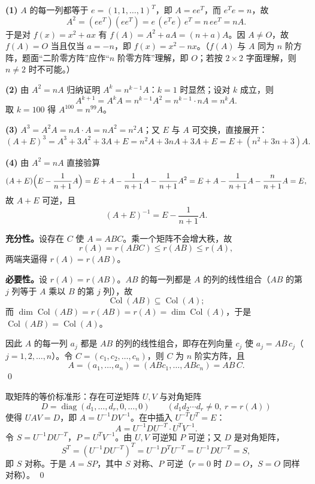 \begin{solution}
\textbf{(1)} $A$ 的每一列都等于 $e=(1,1,\dots,1)^{T}$，即 $A=ee^{T}$，而 $e^{T}e=n$，故
\[
A^{2}=(ee^{T})(ee^{T})=e\,(e^{T}e)\,e^{T}=n\,ee^{T}=nA .
\]
于是对 $f(x)=x^{2}+ax$ 有 $f(A)=A^{2}+aA=(n+a)A$。因 $A\ne O$，故 $f(A)=O$ 当且仅当 $a=-n$，即 $f(x)=x^{2}-nx$。（$f(A)$ 与 $A$ 同为 $n$ 阶方阵，题面“二阶零方阵”应作“$n$ 阶零方阵”理解，即 $O$；若按 $2\times2$ 字面理解，则 $n\ne2$ 时不可能。）

\textbf{(2)} 由 $A^{2}=nA$ 归纳证明 $A^{k}=n^{k-1}A$：$k=1$ 时显然；设对 $k$ 成立，则
\[
A^{k+1}=A^{k}A=n^{k-1}A^{2}=n^{k-1}\cdot nA=n^{k}A .
\]
取 $k=100$ 得 $A^{100}=n^{99}A$。

\textbf{(3)} $A^{3}=A^{2}A=nA\cdot A=nA^{2}=n^{2}A$；又 $E$ 与 $A$ 可交换，直接展开：
\[
(A+E)^{3}=A^{3}+3A^{2}+3A+E=n^{2}A+3nA+3A+E=E+(n^{2}+3n+3)A .
\]

\textbf{(4)} 由 $A^{2}=nA$ 直接验算
\[
(A+E)\Bigl(E-\frac{1}{n+1}A\Bigr)
=E+A-\frac{1}{n+1}A-\frac{1}{n+1}A^{2}
=E+A-\frac{1}{n+1}A-\frac{n}{n+1}A=E,
\]
故 $A+E$ 可逆，且
\[
(A+E)^{-1}=E-\frac{1}{n+1}A .
\]
\end{solution}

\begin{solution}
\textbf{充分性。}设存在 $C$ 使 $A=ABC$。乘一个矩阵不会增大秩，故
\[
r(A)=r(ABC)\le r(AB)\le r(A),
\]
两端夹逼得 $r(A)=r(AB)$。

\textbf{必要性。}设 $r(A)=r(AB)$。$AB$ 的每一列都是 $A$ 的列的线性组合（$AB$ 的第 $j$ 列等于 $A$ 乘以 $B$ 的第 $j$ 列），故
\[
\operatorname{Col}(AB)\subseteq\operatorname{Col}(A);
\]
而 $\dim\operatorname{Col}(AB)=r(AB)=r(A)=\dim\operatorname{Col}(A)$，于是 $\operatorname{Col}(AB)=\operatorname{Col}(A)$。

因此 $A$ 的每一列 $a_j$ 都是 $AB$ 的列的线性组合，即存在列向量 $c_j$ 使 $a_j=AB\,c_j$（$j=1,2,\dots,n$）。令 $C=(c_1,c_2,\dots,c_n)$，则 $C$ 为 $n$ 阶实方阵，且
\[
A=(a_1,\dots,a_n)=(ABc_1,\dots,ABc_n)=AB\,C .
\]
\qed
\end{solution}

\begin{solution}
取矩阵的等价标准形：存在可逆矩阵 $U,V$ 与对角矩阵
\[
D=\operatorname{diag}(d_1,\dots,d_r,0,\dots,0)\qquad(d_1d_2\cdots d_r\ne0,\ r=r(A))
\]
使得 $UAV=D$，即 $A=U^{-1}DV^{-1}$。在中插入 $U^{-T}U^{T}=E$：
\[
A=U^{-1}DU^{-T}\cdot U^{T}V^{-1}.
\]
令 $S=U^{-1}DU^{-T}$，$P=U^{T}V^{-1}$。由 $U,V$ 可逆知 $P$ 可逆；又 $D$ 是对角矩阵，
\[
S^{T}=(U^{-1}DU^{-T})^{T}=U^{-1}D^{T}U^{-T}=U^{-1}DU^{-T}=S,
\]
即 $S$ 对称。于是 $A=SP$，其中 $S$ 对称、$P$ 可逆（$r=0$ 时 $D=O$，$S=O$ 同样对称）。
\qed
\end{solution}
